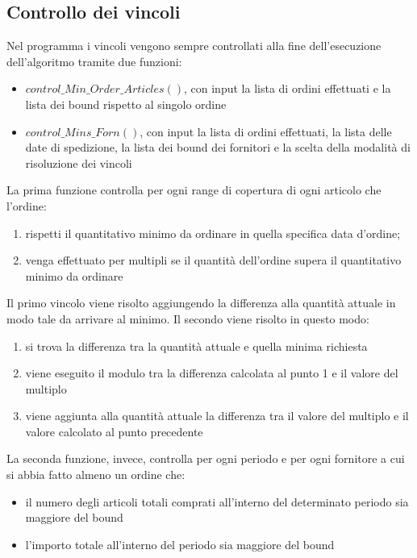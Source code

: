\subsection{Controllo dei vincoli}
\label{sec:controllo-vincoli}
\noindent Nel programma i vincoli vengono sempre controllati alla fine dell'esecuzione dell'algoritmo
tramite due funzioni:
\begin{itemize}
    \item $control\_Min\_Order\_Articles()$, con input la
    lista di ordini effettuati e la lista dei bound rispetto
    al singolo ordine
    \item $control\_Mins\_Forn()$, con input la lista di
    ordini effettuati, la lista delle date di spedizione,
    la lista dei bound dei fornitori e la scelta della
    modalità di risoluzione dei vincoli
\end{itemize}
\newpage
\noindent La prima funzione controlla per ogni range di
copertura di ogni articolo che l'ordine:
\begin{enumerate}
    \item rispetti il quantitativo minimo
    da ordinare in quella specifica data d'ordine;
    \item venga effettuato per multipli se il quantità
    dell'ordine supera il quantitativo minimo da ordinare
\end{enumerate}
Il primo vincolo viene risolto aggiungendo la differenza alla quantità attuale
in modo tale da arrivare al minimo.
Il secondo viene risolto in questo modo:
\begin{enumerate}
    \item si trova la differenza tra la quantità attuale
    e quella minima richiesta
    \item viene eseguito il modulo tra la differenza calcolata al punto 1 e il valore del multiplo
    \item viene aggiunta alla quantità attuale la differenza tra il valore del multiplo e il valore calcolato al punto precedente 
\end{enumerate}
\vspace*{0.5cm}
\noindent La seconda funzione, invece, controlla per ogni 
periodo e per ogni fornitore a cui si abbia fatto
almeno un ordine che:
\begin{itemize}
    \item il numero degli articoli totali comprati all'interno
    del determinato periodo sia maggiore del bound
    \item l'importo totale all'interno del periodo sia
    maggiore del bound
\end{itemize}
